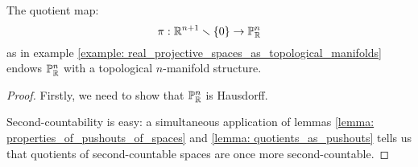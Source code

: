         \begin{proposition} \label{prop: real_projective_spaces_as_topological_manifolds}
            The quotient map:
                $$\pi: \mathbb{R}^{n + 1} \smallsetminus \{0\} \to \mathbb{P}^n_{\mathbb{R}}$$
            as in example \ref{example: real_projective_spaces_as_topological_manifolds} endows $\mathbb{P}^n_{\mathbb{R}}$ with a topological $n$-manifold structure.
        \end{proposition}
            \begin{proof}
                Firstly, we need to show that $\mathbb{P}^n_{\mathbb{R}}$ is Hausdorff.
    
                Second-countability is easy: a simultaneous application of lemmas \ref{lemma: properties_of_pushouts_of_spaces} and \ref{lemma: quotients_as_pushouts} tells us that quotients of second-countable spaces are once more second-countable. 
    

\end{proof}
